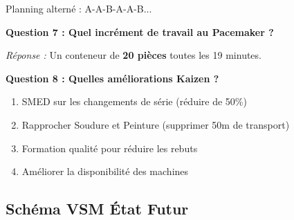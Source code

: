\documentclass[12pt,a4paper]{article}
\begin{document}
Planning alterné : A-A-B-A-A-B...

\medskip

\textbf{Question 7 : Quel incrément de travail au Pacemaker ?}

\textit{Réponse :} Un conteneur de \textbf{20 pièces} toutes les 19 minutes.

\medskip

\textbf{Question 8 : Quelles améliorations Kaizen ?}

\begin{enumerate}
    \item SMED sur les changements de série (réduire de 50\%)
    \item Rapprocher Soudure et Peinture (supprimer 50m de transport)
    \item Formation qualité pour réduire les rebuts
    \item Améliorer la disponibilité des machines
\end{enumerate}

\subsection{Schéma VSM État Futur}
\end{document}
